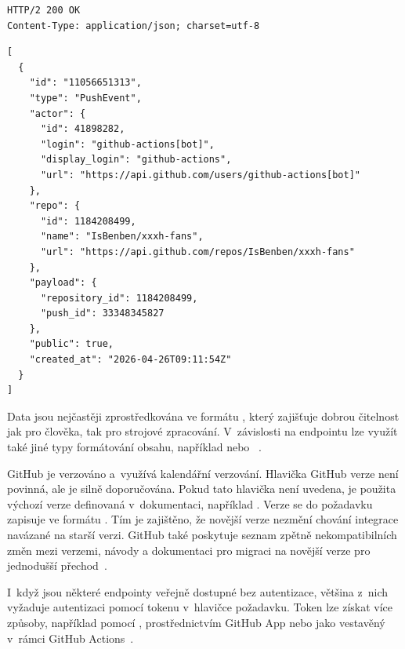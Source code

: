 \begin{listing}[H]
\begin{verbatim}
HTTP/2 200 OK
Content-Type: application/json; charset=utf-8
\end{verbatim}
\begin{verbatim}
[
  {
    "id": "11056651313",
    "type": "PushEvent",
    "actor": {
      "id": 41898282,
      "login": "github-actions[bot]",
      "display_login": "github-actions",
      "url": "https://api.github.com/users/github-actions[bot]"
    },
    "repo": {
      "id": 1184208499,
      "name": "IsBenben/xxxh-fans",
      "url": "https://api.github.com/repos/IsBenben/xxxh-fans"
    },
    "payload": {
      "repository_id": 1184208499,
      "push_id": 33348345827
    },
    "public": true,
    "created_at": "2026-04-26T09:11:54Z"
  }
]
\end{verbatim}
  \caption{Ukázka odpovědi \REST \API na požadavek z~ (zkráceno).}
  \label{lst:github_rest_response}
\end{listing}

Data jsou nejčastěji zprostředkována ve formátu \JSON, který zajišťuje dobrou čitelnost jak pro člověka, tak pro strojové zpracování. V~závislosti na endpointu lze využít také jiné typy formátování obsahu, například  nebo ~\cite{github_rest_api}.

GitHub \REST \API je verzováno a~využívá kalendářní verzování. Hlavička GitHub \API verze  není povinná, ale je silně doporučována. Pokud tato hlavička není uvedena, je použita výchozí verze definovaná v~dokumentaci, například . Verze \API se do požadavku zapisuje ve formátu . Tím je zajištěno, že novější verze nezmění chování integrace navázané na starší verzi.
GitHub také poskytuje seznam zpětně nekompatibilních změn mezi verzemi, návody a dokumentaci pro migraci na novější verze \API pro jednodušší přechod~\cite{github_rest_api_versions}.

I~když jsou některé endpointy veřejně dostupné bez autentizace, většina z~nich vyžaduje autentizaci pomocí tokenu v~hlavičce požadavku. Token lze získat více způsoby, například pomocí \PAT, prostřednictvím GitHub App nebo jako vestavěný  v~rámci GitHub Actions~\cite{github_actions_docs,github_rest_api}.
